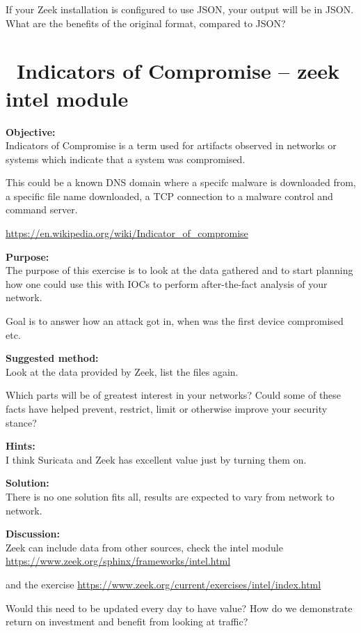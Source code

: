 \documentclass[a4paper,11pt,notitlepage]{report}
\begin{document}
If your Zeek installation is configured to use JSON, your output will be in JSON. What are the benefits of the original format, compared to JSON?



\chapter{\faInfoCircle\  Indicators of Compromise -- zeek intel module }
\label{ex:zeekioc}


{\bf Objective:} \\
Indicators of Compromise is a term used for artifacts observed in networks or systems which indicate that a system was compromised.

This could be a known DNS domain where a specifc malware is downloaded from, a specific file name downloaded, a TCP connection to a malware control and command server.

\url{https://en.wikipedia.org/wiki/Indicator_of_compromise}

{\bf Purpose:}\\
The purpose of this exercise is to look at the data gathered and to start planning how one could use this with IOCs to perform after-the-fact analysis of your network.

Goal is to answer how an attack got in, when was the first device compromised etc.


{\bf Suggested method:}\\
Look at the data provided by Zeek, list the files again.

Which parts will be of greatest interest in your networks? Could some of these facts have helped prevent, restrict, limit or otherwise improve your security stance?


{\bf Hints:}\\
I think Suricata and Zeek has excellent value just by turning them on.


{\bf Solution:}\\
There is no one solution fits all, results are expected to vary from network to network.

{\bf Discussion:}\\
Zeek can include data from other sources, check the intel module\\
\url{https://www.zeek.org/sphinx/frameworks/intel.html}

and the exercise \url{https://www.zeek.org/current/exercises/intel/index.html}

Would this need to be updated every day to have value? How do we demonstrate return on investment and benefit from looking at traffic?
\end{document}
